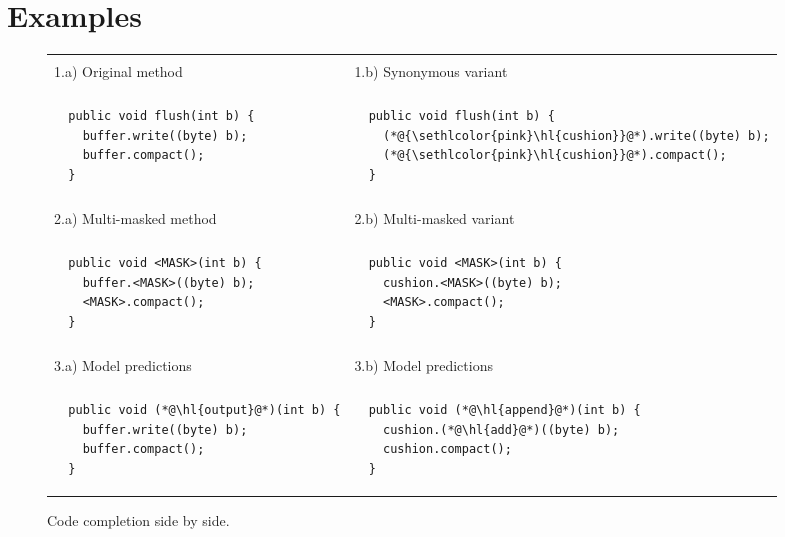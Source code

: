 \documentclass[usenames,dvipsnames]{article} %
\DeclareRobustCommand{\hlred}[1]{{\sethlcolor{pink}\hl{#1}}}
\begin{document}
  \section{Examples}\label{sec:examples}

  \begin{figure}[H]
    \begin{center}
      \begin{tabular}{|p{5cm}|p{5cm}|}
        \hline\\[-1em]1.a) Original method  &  1.b) Synonymous variant\\[-1em]\\\hline
        \begin{lstlisting}
  public void flush(int b) {
    buffer.write((byte) b);
    buffer.compact();
  }
        \end{lstlisting} & \begin{lstlisting}
  public void flush(int b) {
    (*@\hlred{cushion}@*).write((byte) b);
    (*@\hlred{cushion}@*).compact();
  }
        \end{lstlisting}
        \\\hline\\[-1em]2.a) Multi-masked method   &  2.b) Multi-masked variant\\[-1em]\\\hline
        \begin{lstlisting}
  public void <MASK>(int b) {
    buffer.<MASK>((byte) b);
    <MASK>.compact();
  }
        \end{lstlisting} & \begin{lstlisting}
  public void <MASK>(int b) {
    cushion.<MASK>((byte) b);
    <MASK>.compact();
  }
        \end{lstlisting}
        \\\hline\\[-1em]3.a) Model predictions  &  3.b) Model predictions\\[-1em]\\\hline
        \begin{lstlisting}
  public void (*@\hl{output}@*)(int b) {
    buffer.write((byte) b);
    buffer.compact();
  }
        \end{lstlisting} & \begin{lstlisting}
  public void (*@\hl{append}@*)(int b) {
    cushion.(*@\hl{add}@*)((byte) b);
    cushion.compact();
  }
        \end{lstlisting} \\\hline
      \end{tabular}
    \end{center}
    \caption{Code completion side by side.}
    \label{fig:code_completion}
  \end{figure}
\end{document}
